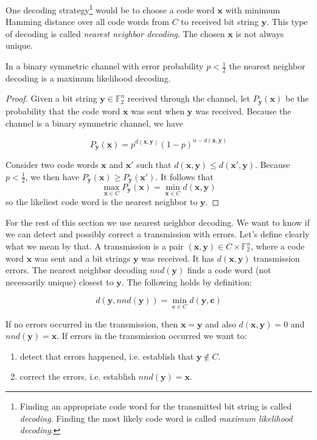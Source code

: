 One decoding strategy\footnote{Finding an appropriate code word for the transmitted bit string is called \textit{decoding}. Finding the most likely code word is called \textit{maximum likelihood decoding}.} would be to choose a code word $\bm{x}$ with minimum Hamming distance over all code words from $C$ to received bit string $\bm{y}$. This type of decoding is called \textit{nearest neighbor decoding}. The chosen $\bm{x}$ is not always unique.

\begin{thm}\label{nnDmaximumLike}
In a binary symmetric channel with error probability $p < \frac{1}{2}$ the nearest neighbor decoding is a maximum likelihood decoding.
\end{thm}

\begin{proof}
Given a bit string $\bm{y} \in \mathbb{F}_2^n$ received through the channel, let $P_{\bm{y}}(\bm{x})$ be the probability that the code word $\bm{x}$ was sent when $\bm{y}$ was received. Because the channel is a binary symmetric channel, we have

$$
P_{\bm{y}}(\bm{x}) = p^{d(\bm{x}, \bm{y})} (1 - p)^{n - d(\bm{x}, \bm{y})}
$$

Consider two code words $\bm{x}$ and $\bm{x'}$ such that $d(\bm{x}, \bm{y}) \leq d(\bm{x'}, \bm{y})$. Because $p < \frac{1}{2}$, we then have $P_{\bm{y}}(\bm{x}) \geq P_{\bm{y}}(\bm{x'})$. It follows that
$$
\max_{\bm{x} \in C} P_{\bm{y}}(\bm{x}) = \min_{\bm{x} \in C} d(\bm{x}, \bm{y})
$$
so the likeliest code word is the nearest neighbor to $\bm{y}$.
\end{proof}

For the rest of this section we use nearest neighbor decoding. We want to know if we can detect and possibly correct a transmission with errors. Let's define clearly what we mean by that. A transmission is a pair $(\bm{x}, \bm{y}) \in C \times \mathbb{F}_2^n$, where a code word $\bm{x}$ was sent and a bit strings $\bm{y}$ was received. It has $d(\bm{x}, \bm{y})$ transmission errors. The nearest neighbor decoding $nnd(\bm{y})$ finds a code word (not necessarily unique) closest to $\bm{y}$. The following holds by definition:

$$
d(\bm{y}, nnd(\bm{y})) = \min_{\bm{c} \in C} d(\bm{y}, \bm{c})
$$

If no errors occurred in the transmission, then $\bm{x} = \bm{y}$ and also $d(\bm{x}, \bm{y}) = 0$ and $nnd(\bm{y}) = \bm{x}$. If errors in the transmission occurred we want to:

\begin{enumerate}[label=\textbf{E.\arabic*}]
\item \label{transmissionErrorRecogOne} detect that errors happened, i.e. establish that $\bm{y} \notin C$.
\item \label{transmissionErrorRecogTwo} correct the errors, i.e. establish $nnd(\bm{y}) = \bm{x}$.
\end{enumerate}

